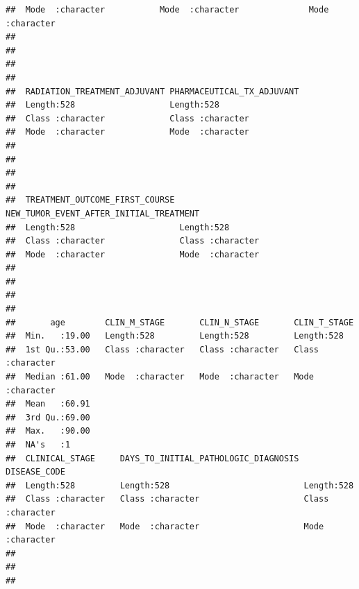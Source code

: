 \documentclass[
  11pt,
]{article}
\begin{document}
\begin{verbatim}
##  Mode  :character           Mode  :character              Mode  :character  
##                                                                             
##                                                                             
##                                                                             
##                                                                             
##  RADIATION_TREATMENT_ADJUVANT PHARMACEUTICAL_TX_ADJUVANT
##  Length:528                   Length:528                
##  Class :character             Class :character          
##  Mode  :character             Mode  :character          
##                                                         
##                                                         
##                                                         
##                                                         
##  TREATMENT_OUTCOME_FIRST_COURSE NEW_TUMOR_EVENT_AFTER_INITIAL_TREATMENT
##  Length:528                     Length:528                             
##  Class :character               Class :character                       
##  Mode  :character               Mode  :character                       
##                                                                        
##                                                                        
##                                                                        
##                                                                        
##       age        CLIN_M_STAGE       CLIN_N_STAGE       CLIN_T_STAGE      
##  Min.   :19.00   Length:528         Length:528         Length:528        
##  1st Qu.:53.00   Class :character   Class :character   Class :character  
##  Median :61.00   Mode  :character   Mode  :character   Mode  :character  
##  Mean   :60.91                                                           
##  3rd Qu.:69.00                                                           
##  Max.   :90.00                                                           
##  NA's   :1                                                               
##  CLINICAL_STAGE     DAYS_TO_INITIAL_PATHOLOGIC_DIAGNOSIS DISEASE_CODE      
##  Length:528         Length:528                           Length:528        
##  Class :character   Class :character                     Class :character  
##  Mode  :character   Mode  :character                     Mode  :character  
##                                                                            
##                                                                            
##                                                                            

\end{verbatim}
\end{document}

